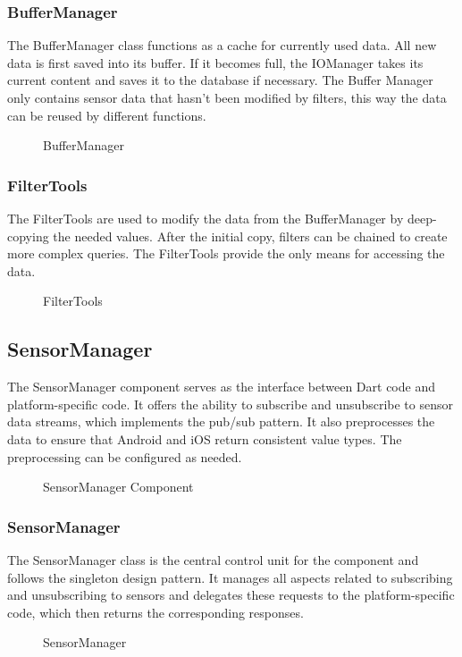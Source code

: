 \documentclass[12pt]{article}
\newcounter{fr}
\begin{document}
\subsubsection{BufferManager}
The BufferManager class functions as a cache for currently used data. All new data is first saved into its buffer. If it becomes full, the IOManager takes its current content and saves it to the database if necessary. The Buffer Manager only contains sensor data that hasn't been modified by filters, this way the data can be reused by different functions.
\begin{figure}[ht]
\centering

\caption{\label{fig:bild7} BufferManager}
\end{figure}

\newpage
\subsubsection{FilterTools}
The FilterTools are used to modify the data from the BufferManager by deep-copying the needed values. After the initial copy, filters can be chained to create more complex queries. The FilterTools provide the only means for accessing the data.
\begin{figure}[ht]
\centering

\caption{\label{fig:bild8} FilterTools}
\end{figure}
\newpage

\subsection{SensorManager}
The SensorManager component serves as the interface between Dart code and platform-specific code. It offers the ability to subscribe and unsubscribe to sensor data streams, which implements the pub/sub pattern. It also preprocesses the data to ensure that Android and iOS return consistent value types. The preprocessing can be configured as needed.
\begin{figure}[ht]
\centering

\caption{\label{fig:bild9} SensorManager Component}
\end{figure}

\subsubsection{SensorManager}
The SensorManager class is the central control unit for the component and follows the singleton design pattern. It manages all aspects related to subscribing and unsubscribing to sensors and delegates these requests to the platform-specific code, which then returns the corresponding responses.
\begin{figure}[ht]
\centering

\caption{\label{fig:bild10} SensorManager}
\end{figure}
\end{document}
